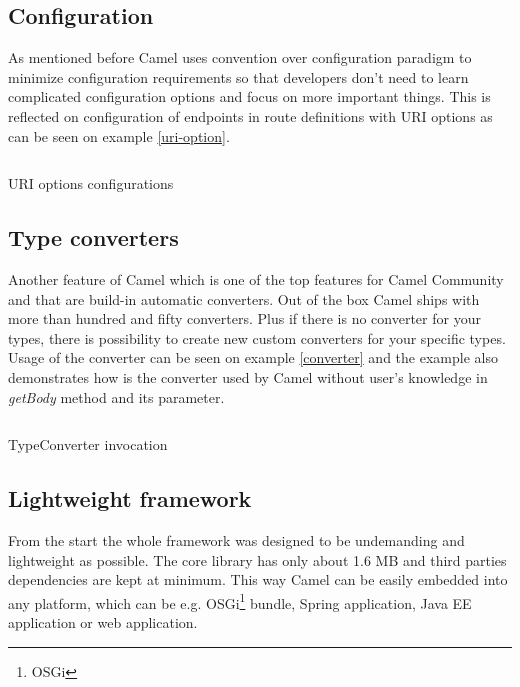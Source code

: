 \documentclass[12pt,final,oneside]{fithesis2}
\begin{document}
\subsection*{Configuration}
As mentioned before Camel uses convention over configuration paradigm to minimize configuration requirements so that developers don't need to learn complicated configuration options and focus on more important things.  This is reflected on configuration of endpoints in route definitions with URI options as can be seen on example \ref{uri-option}.
\begin{listing}[ht]
	\inputminted[]{java}{sources/uri.java}
	\caption{URI options configurations}
	\label{uri-option}
\end{listing}

\subsection*{Type converters}
Another feature of Camel which is one of the top features for Camel Community and that are build-in automatic converters. Out of the box Camel ships with more than hundred and fifty converters\cite{camel-in-action}. Plus if there is no converter for your types, there is possibility to create new custom converters for your specific types. Usage of the converter can be seen on example \ref{converter} and the example also demonstrates how is the converter used by Camel without user's knowledge in \textit{getBody} method and its parameter.

\begin{listing}[ht, p!]
	\inputminted[]{java}{sources/converter.java}
	\caption{TypeConverter invocation}
	\label{converter}
\end{listing}


\subsection*{Lightweight framework}
From the start the whole framework was designed to be undemanding and lightweight as possible. The core library has only about 1.6 MB and third parties dependencies are kept at minimum. This way Camel can be easily embedded into any platform, which can be e.g. OSGi\footnote{OSGi} bundle, Spring application, Java EE application or web application. 
\end{document}
